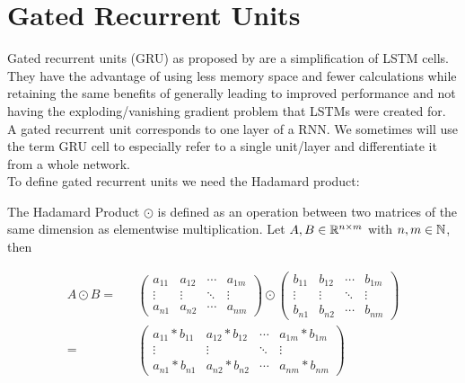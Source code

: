 \section{Gated Recurrent Units}
Gated recurrent units (GRU) as proposed by \cite{cho-2014} are a simplification of LSTM cells. They have the advantage of using less memory space and fewer calculations while retaining the same benefits of generally leading to improved performance and not having the exploding/vanishing gradient problem that LSTMs were created for.\\
A gated recurrent unit corresponds to one layer of a RNN. We sometimes will use the term GRU cell to especially refer to a single unit/layer and differentiate it from a whole network. \\
To define gated recurrent units we need the Hadamard product:
\begin{definition}
    The Hadamard Product $\odot$ is defined as an operation between two matrices of the same dimension as elementwise multiplication. Let $A,B\in \mathbb{R}^{n\times m}$ with $n,m \in \mathbb{N}$, then 

\begin{align*}
 A \odot B= && \begin{pmatrix}
a_{11} & a_{12} & \cdots & a_{1m} \\
\vdots & \vdots & \ddots & \vdots \\
a_{n1} & a_{n2} & \cdots & a_{nm}
\end{pmatrix} 
\odot
\begin{pmatrix}
b_{11} & b_{12} & \cdots & b_{1m} \\
\vdots & \vdots & \ddots & \vdots \\
b_{n1} & b_{n2} & \cdots & b_{nm} 
\end{pmatrix} \\ = 
&& \begin{pmatrix}
a_{11}*b_{11} & a_{12}*b_{12} & \cdots & a_{1m}*b_{1m} \\
\vdots & \vdots & \ddots & \vdots \\
a_{n1}*b_{n1} & a_{n2}*b_{n2} & \cdots & a_{nm}*b_{nm}
\end{pmatrix}
\end{align*}

\end{definition}

